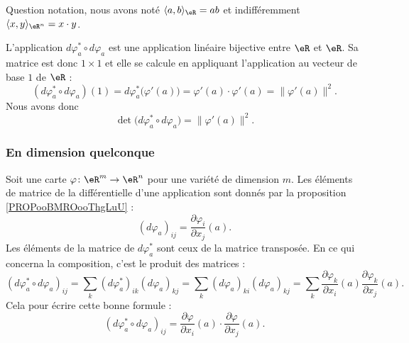 Question notation, nous avons noté \( \langle a, b\rangle_{\eR}=ab\) et indifféremment \( \langle x, y\rangle_{\eR^n}=x\cdot y\).

L'application \( d\varphi_a^*\circ d\varphi_a\) est une application linéaire bijective entre \( \eR\) et \( \eR\). Sa matrice est donc \( 1\times 1\) et elle se calcule en appliquant l'application au vecteur de base \( 1\) de \( \eR\) :
\begin{equation}
    (d\varphi_a^*\circ d\varphi_a)(1)=d\varphi_a^*\big( \varphi'(a) \big)=\varphi'(a)\cdot \varphi'(a)=\| \varphi'(a) \|^2.
\end{equation}
Nous avons donc
\begin{equation}
    \det\big( d\varphi^*_a\circ d\varphi_a \big)=\| \varphi'(a) \|^2.
\end{equation}

\subsubsection{En dimension quelconque}

Soit une carte \( \varphi\colon \eR^m\to \eR^n\) pour une variété de dimension \( m\). Les éléments de matrice de la différentielle d'une application sont donnés par la proposition \ref{PROPooBMROooThgLuU} :
\begin{equation}
    (d\varphi_a)_{ij}=\frac{ \partial \varphi_i }{ \partial x_j }(a).
\end{equation}
Les éléments de la matrice de \( d\varphi_a^*\) sont ceux de la matrice transposée. En ce qui concerna la composition, c'est le produit des matrices :
\begin{equation}
    (d\varphi_a^*\circ d\varphi_a)_{ij}=\sum_k(d\varphi_a^*)_{ik}(d\varphi_a)_{kj}=\sum_k(d\varphi_a)_{ki}(d\varphi_a)_{kj}=\sum_k\frac{ \partial \varphi_k }{ \partial x_i }(a)\frac{ \partial \varphi_k }{ \partial x_j }(a).
\end{equation}
Cela pour écrire cette bonne formule :
\begin{equation}        \label{EQooQRQKooJVJRsy}
    (d\varphi_a^*\circ d\varphi_a)_{ij}=\frac{ \partial \varphi }{ \partial x_i }(a)\cdot \frac{ \partial \varphi }{ \partial x_j }(a).
\end{equation}

